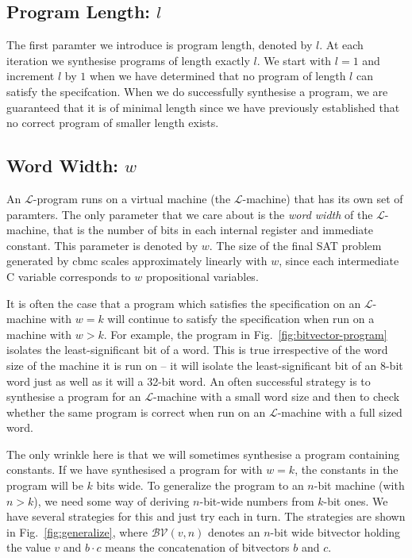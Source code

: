 \documentclass[a4paper]{llncs}
\begin{document}
\subsection{Program Length: $l$}
The first paramter we introduce is program length, denoted by $l$.
At each iteration we synthesise programs of length exactly $l$.
We start with $l = 1$ and increment $l$ by $1$ when we have determined
that no program of length $l$ can satisfy the specifcation.  When we do
successfully synthesise a program, we are guaranteed that it
is of minimal length since we have previously established that no
correct program of smaller length exists.


\subsection{Word Width: $w$}
An $\mathcal{L}$-program runs on a virtual machine (the $\mathcal{L}$-machine) that
has its own set of paramters.  The only parameter that we care about is
the \emph{word width} of the $\mathcal{L}$-machine, that is the number of bits
in each internal register and immediate constant.  This parameter is denoted by
$w$.  The size of the final SAT problem generated by {\sc cbmc} scales
approximately linearly with $w$, since each intermediate C variable corresponds
to $w$ propositional variables.

It is often the case that a program which satisfies the specification
on an $\mathcal{L}$-machine with $w = k$ will continue to satisfy the
specification when run on a machine with $w > k$.  For example, the program
in Fig.~\ref{fig:bitvector-program} isolates the least-significant bit of a word.
This is true irrespective of the word size of the machine it is run on -- it will
isolate the least-significant bit of an 8-bit word just as well as it will a
32-bit word.  An often successful strategy is to synthesise a program for an
$\mathcal{L}$-machine with a small word size and then to check whether the
same program is correct when run on an $\mathcal{L}$-machine with a full
sized word.

The only wrinkle here is that we will sometimes synthesise a program containing
constants.  If we have synthesised a program for with $w=k$,
the constants in the program will be $k$ bits wide.  To generalize the program
to an $n$-bit machine (with $n > k$), we need some way of deriving $n$-bit-wide
numbers from $k$-bit ones.  We have several strategies for this and
just try each in turn.  The strategies are shown in Fig.~\ref{fig:generalize},
where $\mathcal{BV}(v, n)$ denotes an $n$-bit wide bitvector holding the value $v$
and $b \cdotp c$ means the concatenation of bitvectors $b$ and $c$.
\end{document}
